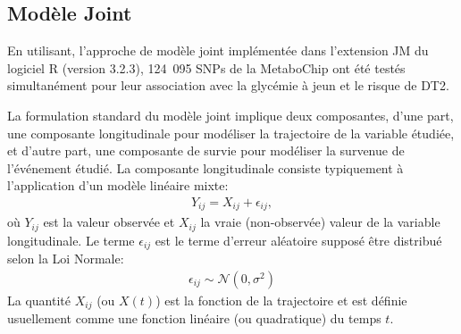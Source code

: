 \documentclass[11pt, a4paper]{article}
\begin{document}
\subsection{Modèle Joint}
\begin{figure}[ht]
    \begin{center}
    \end{center}
    \vspace{-15pt}
    \label{fig:JointModel}
\end{figure}
\par{En utilisant, l'approche de modèle joint implémentée dans l'extension JM \citep{rizopoulos_jm_2010} du logiciel R (version 3.2.3)\citep{r_core_team_r_2015},
124~095 SNPs de la MetaboChip ont été testés simultanément pour leur association avec la glycémie à jeun et le risque de DT2.}

\par{La formulation standard du modèle joint implique deux composantes, d'une part, une composante longitudinale pour modéliser la trajectoire de la variable étudiée,
et d'autre part, une composante de survie pour modéliser la survenue de l'événement étudié.
La composante longitudinale consiste typiquement à l'application d'un modèle linéaire mixte:
\begin{eqnarray}Y_{ij}=X_{ij}+\epsilon_{ij},\label{eq:1}\end{eqnarray}
où $Y_{ij}$ est la valeur observée et $X_{ij}$ la vraie (non-observée) valeur de la variable longitudinale.
Le terme $\epsilon_{ij}$ est le terme d'erreur aléatoire supposé être distribué selon la Loi Normale:
\begin{eqnarray}\epsilon_{ij} \sim \mathcal{N}(0, \sigma^2)\label{eq:2}\end{eqnarray}
La quantité $X_{ij}$ (ou $X(t)$) est la fonction de la trajectoire et est définie usuellement comme une fonction linéaire (ou quadratique) du temps $t$.}
\end{document}
